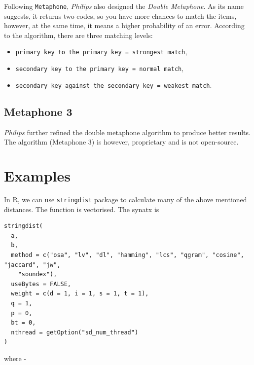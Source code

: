 \documentclass[
]{book}
\providecommand{\tightlist}{%
  \setlength{\itemsep}{0pt}\setlength{\parskip}{0pt}}
\begin{document}
Following \texttt{Metaphone}, \emph{Philips} also designed the \emph{Double Metaphone}. As its name suggests, it returns two codes, so you have more chances to match the items, however, at the same time, it means a higher probability of an error. According to the algorithm, there are three matching levels:

\begin{itemize}
\tightlist
\item
  \texttt{primary\ key\ to\ the\ primary\ key\ =\ strongest\ match},
\item
  \texttt{secondary\ key\ to\ the\ primary\ key\ =\ normal\ match},
\item
  \texttt{secondary\ key\ against\ the\ secondary\ key\ =\ weakest\ match}.
\end{itemize}

\hypertarget{metaphone-3}{%
\subsection{Metaphone 3}\label{metaphone-3}}

\emph{Philips} further refined the double metaphone algorithm to produce better results. The algorithm (Metaphone 3) is however, proprietary and is not open-source.

\hypertarget{examples}{%
\section{Examples}\label{examples}}

In R, we can use \texttt{stringdist} package to calculate many of the above mentioned distances. The function is vectorised. The synatx is

\begin{verbatim}
stringdist(
  a,
  b,
  method = c("osa", "lv", "dl", "hamming", "lcs", "qgram", "cosine", "jaccard", "jw",
    "soundex"),
  useBytes = FALSE,
  weight = c(d = 1, i = 1, s = 1, t = 1),
  q = 1,
  p = 0,
  bt = 0,
  nthread = getOption("sd_num_thread")
)
\end{verbatim}

where -
\end{document}
